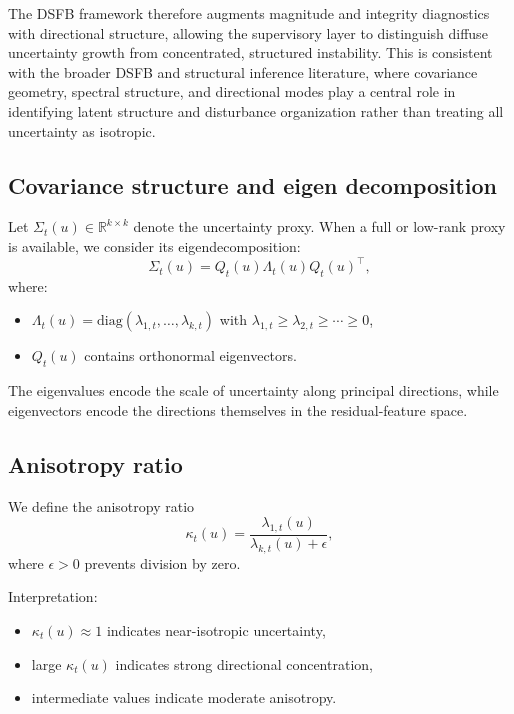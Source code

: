\documentclass[11pt]{article}
\theoremstyle{definition}
\theoremstyle{plain}
\begin{document}
The DSFB framework therefore augments magnitude and integrity diagnostics with directional structure, allowing the supervisory layer to distinguish diffuse uncertainty growth from concentrated, structured instability. This is consistent with the broader DSFB and structural inference literature, where covariance geometry, spectral structure, and directional modes play a central role in identifying latent structure and disturbance organization rather than treating all uncertainty as isotropic. 


\subsection{Covariance structure and eigen decomposition}

Let $\Sigma_t(u)\in\mathbb{R}^{k\times k}$ denote the uncertainty proxy. When a full or low-rank proxy is available, we consider its eigendecomposition:
\begin{equation}
\Sigma_t(u)=Q_t(u)\Lambda_t(u)Q_t(u)^\top,
\end{equation}
where:
\begin{itemize}[leftmargin=1.5em]
    \item $\Lambda_t(u)=\mathrm{diag}(\lambda_{1,t},\dots,\lambda_{k,t})$ with $\lambda_{1,t}\ge \lambda_{2,t}\ge \cdots \ge 0$,
    \item $Q_t(u)$ contains orthonormal eigenvectors.
\end{itemize}

The eigenvalues encode the scale of uncertainty along principal directions, while eigenvectors encode the directions themselves in the residual-feature space.


\subsection{Anisotropy ratio}

We define the anisotropy ratio
\begin{equation}
\kappa_t(u)=\frac{\lambda_{1,t}(u)}{\lambda_{k,t}(u)+\epsilon},
\end{equation}
where $\epsilon>0$ prevents division by zero.

Interpretation:
\begin{itemize}[leftmargin=1.5em]
    \item $\kappa_t(u)\approx 1$ indicates near-isotropic uncertainty,
    \item large $\kappa_t(u)$ indicates strong directional concentration,
    \item intermediate values indicate moderate anisotropy.
\end{itemize}
\end{document}

